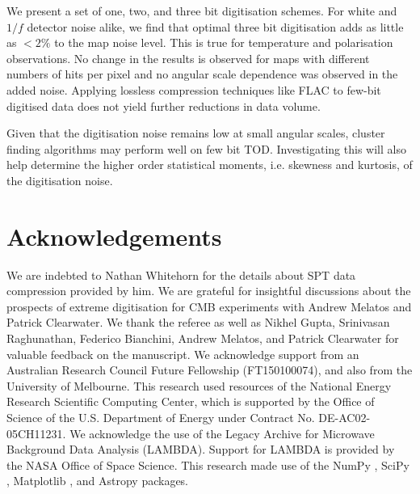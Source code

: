\documentclass[a4paper,fleqn,usenatbib]{mnras}
\begin{document}
We present a set of one, two, and three bit digitisation schemes. For white and $1/f$ detector noise alike, we find that optimal three bit digitisation adds as little as $<2\%$ to the map noise level. This is true for temperature and polarisation observations. No change in the results is observed for maps with different numbers of hits per pixel and no angular scale dependence was observed in the added noise. Applying lossless compression techniques like FLAC to few-bit digitised data does not yield further reductions in data volume.

Given that the digitisation noise remains low at small angular scales, cluster finding algorithms may perform well on few bit TOD. Investigating this will also help determine the higher order statistical moments, i.e. skewness and kurtosis, of the digitisation noise.

\section*{Acknowledgements}

We are indebted to Nathan Whitehorn for the details about SPT data compression provided by him.
We are grateful for insightful discussions about the prospects of extreme digitisation for CMB experiments with Andrew Melatos and Patrick Clearwater.
We thank the referee as well as Nikhel Gupta, Srinivasan Raghunathan, Federico Bianchini, Andrew Melatos, and Patrick Clearwater for valuable feedback on the manuscript.
We acknowledge support from an Australian Research Council Future Fellowship (FT150100074), and also from the University of Melbourne. 
This research used resources of the National Energy Research Scientific Computing Center, which is supported by the Office of Science of the U.S. Department of Energy under Contract No. DE-AC02-05CH11231. 
We acknowledge the use of the Legacy Archive for Microwave Background Data Analysis (LAMBDA). Support for LAMBDA is provided by the NASA Office of Space Science.
This research made use of the NumPy \citep{numpy}, SciPy \citep{scipy}, Matplotlib \citep{matplotlib}, and Astropy \citep{astropy} packages.





\end{document}
